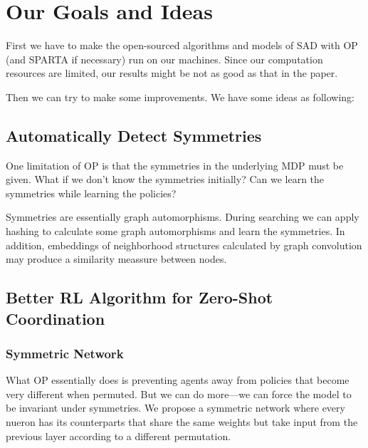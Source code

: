 \documentclass[11pt]{article}
\begin{document}

\section{Our Goals and Ideas}

First we have to make the open-sourced algorithms and models of SAD with OP\cite{hu2020other} (and SPARTA\cite{lerer2020improving} if necessary) run on our machines. Since our computation resources are limited, our results might be not as good as that in the paper.

Then we can try to make some improvements. We have some ideas as following:

\subsection{Automatically Detect Symmetries}

One limitation of OP is that the symmetries in the underlying MDP must be given. What if we don't know the symmetries initially? Can we learn the symmetries while learning the policies?

Symmetries are essentially graph automorphisms. During searching we can apply hashing to calculate some graph automorphisms and learn the symmetries. In addition, embeddings of neighborhood structures calculated by graph convolution may produce a similarity meassure between nodes.

\subsection{Better RL Algorithm for Zero-Shot Coordination}

\subsubsection{Symmetric Network}

What OP essentially does is preventing agents away from policies that become very different when permuted. But we can do more---we can force the model to be invariant under symmetries. We propose a symmetric network where every nueron has its counterparts that share the same weights but take input from the previous layer according to a different permutation.
\end{document}
